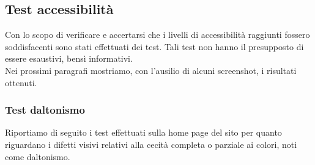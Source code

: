 \subsection{Test accessibilità}
Con lo scopo di verificare e accertarsi che i livelli di accessibilità raggiunti fossero soddisfacenti sono stati effettuati dei test. Tali test non hanno il presupposto di essere esaustivi, bensì informativi.\\
Nei prossimi paragrafi mostriamo, con l'ausilio di alcuni screenshot, i risultati ottenuti.

\subsubsection{Test daltonismo}
Riportiamo di seguito i test effettuati sulla home page del sito per quanto riguardano i difetti visivi relativi alla cecità completa o parziale ai colori, noti come daltonismo.
